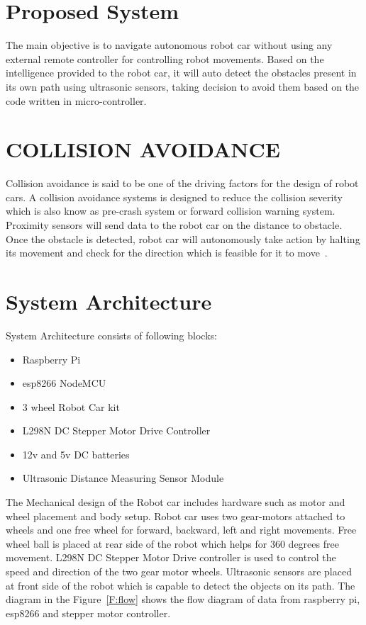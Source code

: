 \section{Proposed System}
The main objective is to navigate autonomous robot car without using any 
external remote controller for controlling robot movements. Based on the 
intelligence provided to the robot car, it will auto detect the obstacles 
present in its own path using ultrasonic sensors, taking decision to avoid 
them based on the code written in micro-controller.

\section{COLLISION AVOIDANCE}
Collision avoidance is said to be one of the driving factors for the design 
of robot cars. A collision avoidance systems is designed to reduce the 
collision severity which is also know as pre-crash system or forward 
collision warning system. Proximity sensors will send data to the robot car 
on the distance to obstacle. Once the obstacle is detected, robot car will 
autonomously take action by halting its movement and check for the direction 
which is feasible for it to move~\cite{stratis2009}. 

\section{System Architecture}
System Architecture consists of following blocks:

\begin{itemize}
\item Raspberry Pi
\item esp8266 NodeMCU
\item 3 wheel Robot Car kit
\item L298N DC Stepper Motor Drive Controller
\item 12v and 5v DC batteries
\item Ultrasonic Distance Measuring Sensor Module 
\end{itemize}

The Mechanical design of the Robot car includes hardware such as motor and 
wheel placement and body setup. Robot car uses two gear-motors attached to 
wheels and one free wheel for forward, backward, left and right movements. 
Free wheel ball is placed at rear side of the robot which helps for 360 
degrees free movement. L298N DC Stepper Motor Drive controller is used to 
control the speed and direction of the two gear motor wheels. Ultrasonic 
sensors are placed at front side of the robot which is capable to detect the 
objects on its path. The diagram in the Figure~\ref{F:flow} shows the flow 
diagram of data from raspberry pi, esp8266 and stepper motor controller.

